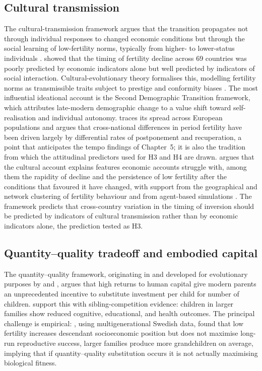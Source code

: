 \documentclass[12pt,a4paper]{report}
\begin{document}
\subsection{Cultural transmission}
The cultural-transmission framework argues that the transition propagates not through individual
responses to changed economic conditions but through the social learning of low-fertility norms,
typically from higher- to lower-status individuals \citep{bongaartswatkins1996}.
\citet{bongaartswatkins1996} showed that the timing of fertility decline across 69 countries was
poorly predicted by economic indicators alone but well predicted by indicators of social
interaction. Cultural-evolutionary theory formalises this, modelling fertility norms as
transmissible traits subject to prestige and conformity biases \citep{boydricherson1985,mesoudi2011}.
The most influential ideational account is the Second Demographic Transition framework, which
attributes late-modern demographic change to a value shift toward self-realisation and individual
autonomy. \citet{lesthaeghe2010} traces its spread across
European populations and argues that cross-national differences in period fertility have been
driven largely by differential rates of postponement and recuperation, a point that
anticipates the tempo findings of Chapter~5; it is also the tradition from which the attitudinal
predictors used for H3 and H4 are drawn.
\citet{colleran2016,colleran2020} argues that the cultural account explains features economic
accounts struggle with, among them the rapidity of decline and the persistence of
low fertility after the conditions that favoured it have changed, with support from the
geographical and network clustering of fertility behaviour \citep{watkins1991,balbobarban2014} and
from agent-based simulations \citep{colleranmace2015}.
The framework predicts that cross-country variation in the timing of inversion should be predicted
by indicators of cultural transmission rather than by economic indicators alone, the prediction
tested as H3.

\subsection{Quantity--quality tradeoff and embodied capital}
The quantity--quality framework, originating in \citet{becker1960} and developed for evolutionary
purposes by \citet{kaplan1996} and \citet{kaplanlancaster2003}, argues that high returns to human
capital give modern parents an unprecedented incentive to substitute investment per child for
number of children. \citet{lawsonmace2011} support this with sibling-competition evidence: children
in larger families show reduced cognitive, educational, and health outcomes. The principal challenge
is empirical: \citet{goodman2012}, using multigenerational Swedish data, found that low fertility
increases descendant socioeconomic position but does not maximise long-run reproductive
success, larger families produce more grandchildren on average, implying that if quantity--quality
substitution occurs it is not actually maximising biological fitness.
\end{document}
